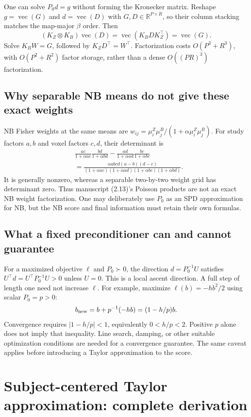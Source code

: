 \documentclass[11pt,a4paper]{article}
\newcommand{\R}{\mathbb R}
\numberwithin{equation}{section}
\begin{document}
One can solve $P_0d=g$ without forming the Kronecker matrix.
Reshape $g=\operatorname{vec}(G)$ and $d=\operatorname{vec}(D)$
with $G,D\in\R^{P\times R}$, so their column stacking matches
the map-major $\beta$ order.
Then
\[
 (K_Z\otimes K_B)\operatorname{vec}(D)
  =\operatorname{vec}(K_BDK_Z^\top)=\operatorname{vec}(G).
\]
Solve $K_BW=G$, followed by $K_ZD^\top=W^\top$.
Factorization costs $O(P^3+R^3)$, with $O(P^2+R^2)$ factor
storage, rather than a dense $O((PR)^3)$ factorization.

\subsection{Why separable NB means do not give these exact weights}
NB Fisher weights at the same means are
$w_{ij}=\mu_i^Z\mu_j^B/(1+\alpha\mu_i^Z\mu_j^B)$.
For study factors $a,b$ and voxel factors $c,d$, their determinant is
\begin{align}
 &\frac{ac}{1+\alpha ac}\frac{bd}{1+\alpha bd}
   -\frac{ad}{1+\alpha ad}\frac{bc}{1+\alpha bc}\\
 &=\frac{\alpha abcd(a-b)(d-c)}
 {(1+\alpha ac)(1+\alpha ad)(1+\alpha bc)(1+\alpha bd)}.
\end{align}
It is generally nonzero, whereas a separable two-by-two weight grid
has determinant zero. Thus manuscript (2.13)'s Poisson products
are not an exact NB weight factorization.
One may deliberately use $P_0$ as an SPD approximation for NB,
but the NB score and final information must retain their own formulas.

\subsection{What a fixed preconditioner can and cannot guarantee}
For a maximized objective $\ell$ and $P_0\succ0$, the direction
$d=P_0^{-1}U$ satisfies $U^\top d=U^\top P_0^{-1}U>0$
unless $U=0$. This is a local ascent direction.
A full step of length one need not increase $\ell$.
For example, maximize $\ell(b)=-h b^2/2$ using scalar $P_0=p>0$:
\[
 b_{\rm new}=b+p^{-1}(-hb)=(1-h/p)b.
\]
Convergence requires $|1-h/p|<1$, equivalently $0<h/p<2$.
Positive $p$ alone does not imply that inequality.
Line search, damping, or other suitable optimization conditions are
needed for a convergence guarantee. The same caveat applies before
introducing a Taylor approximation to the score.

\section{Subject-centered Taylor approximation: complete derivation}
\label{lesion-taylor}
\end{document}

